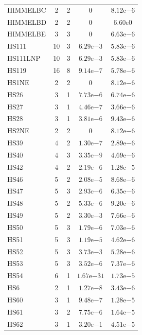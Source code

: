\documentclass[11pt]{article}
\begin{document}
\begin{center}
\begin{longtable}{lcccc}
HIMMELBC & 2 & 2 & $0$ & $8.12\mathrm{e}{-6}$\\
HIMMELBD & 2 & 2 & $0$ & $6.60\mathrm{e}{0}$\\
HIMMELBE & 3 & 3 & $0$ & $6.63\mathrm{e}{-6}$\\
HS111 & 10 & 3 & $6.29\mathrm{e}{-3}$ & $5.83\mathrm{e}{-6}$\\
HS111LNP & 10 & 3 & $6.29\mathrm{e}{-3}$ & $5.83\mathrm{e}{-6}$\\
HS119 & 16 & 8 & $9.14\mathrm{e}{-7}$ & $5.78\mathrm{e}{-6}$\\
HS1NE & 2 & 2 & $0$ & $8.12\mathrm{e}{-6}$\\
HS26 & 3 & 1 & $7.73\mathrm{e}{-6}$ & $6.74\mathrm{e}{-6}$\\
HS27 & 3 & 1 & $4.46\mathrm{e}{-7}$ & $3.66\mathrm{e}{-6}$\\
HS28 & 3 & 1 & $3.81\mathrm{e}{-6}$ & $9.43\mathrm{e}{-6}$\\
HS2NE & 2 & 2 & $0$ & $8.12\mathrm{e}{-6}$\\
HS39 & 4 & 2 & $1.30\mathrm{e}{-7}$ & $2.89\mathrm{e}{-6}$\\
HS40 & 4 & 3 & $3.35\mathrm{e}{-9}$ & $4.69\mathrm{e}{-6}$\\
HS42 & 4 & 2 & $2.19\mathrm{e}{-6}$ & $1.28\mathrm{e}{-5}$\\
HS46 & 5 & 2 & $2.08\mathrm{e}{-5}$ & $8.68\mathrm{e}{-6}$\\
HS47 & 5 & 3 & $2.93\mathrm{e}{-6}$ & $6.35\mathrm{e}{-6}$\\
HS48 & 5 & 2 & $5.33\mathrm{e}{-6}$ & $9.20\mathrm{e}{-6}$\\
HS49 & 5 & 2 & $3.30\mathrm{e}{-3}$ & $7.66\mathrm{e}{-6}$\\
HS50 & 5 & 3 & $1.79\mathrm{e}{-6}$ & $7.03\mathrm{e}{-6}$\\
HS51 & 5 & 3 & $1.19\mathrm{e}{-5}$ & $4.62\mathrm{e}{-6}$\\
HS52 & 5 & 3 & $3.73\mathrm{e}{-3}$ & $5.28\mathrm{e}{-6}$\\
HS53 & 5 & 3 & $3.52\mathrm{e}{-6}$ & $7.37\mathrm{e}{-6}$\\
HS54 & 6 & 1 & $1.67\mathrm{e}{-31}$ & $1.73\mathrm{e}{-5}$\\
HS6 & 2 & 1 & $1.27\mathrm{e}{-8}$ & $3.43\mathrm{e}{-6}$\\
HS60 & 3 & 1 & $9.48\mathrm{e}{-7}$ & $1.28\mathrm{e}{-5}$\\
HS61 & 3 & 2 & $7.75\mathrm{e}{-6}$ & $1.64\mathrm{e}{-5}$\\
HS62 & 3 & 1 & $3.20\mathrm{e}{-1}$ & $4.51\mathrm{e}{-5}$\\

\end{longtable}
\end{center}
\end{document}
